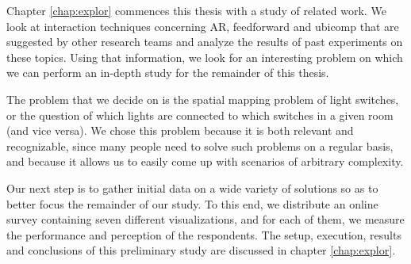 
Chapter \ref{chap:explor} commences this thesis with a study of related work. We look at interaction techniques concerning AR, feedforward and ubicomp that are suggested by other research teams and analyze the results of past experiments on these topics. Using that information, we look for an interesting problem on which we can perform an in-depth study for the remainder of this thesis.

The problem that we decide on is the spatial mapping problem of light switches, or the question of which lights are connected to which switches in a given room (and vice versa). We chose this problem because it is both relevant and recognizable, since many people need to solve such problems on a regular basis, and because it allows us to easily come up with scenarios of arbitrary complexity.

Our next step is to gather initial data on a wide variety of solutions so as to better focus the remainder of our study. To this end, we distribute an online survey containing seven different visualizations, and for each of them, we measure the performance and perception of the respondents. The setup, execution, results and conclusions of this preliminary study are discussed in chapter \ref{chap:explor}.




